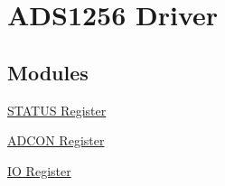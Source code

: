 \hypertarget{group__ads1256__driver}{\section{A\-D\-S1256 Driver}
\label{group__ads1256__driver}
}
\subsection*{Modules}
\begin{DoxyCompactItemize}
\item 
\hyperlink{group__status__register}{S\-T\-A\-T\-U\-S Register}
\item 
\hyperlink{group__adcon__register}{A\-D\-C\-O\-N Register}
\item 
\hyperlink{group__io__register}{I\-O Register}
\end{DoxyCompactItemize}
